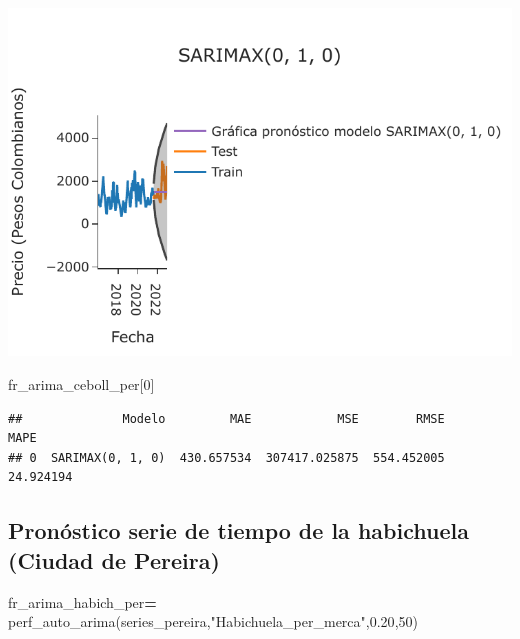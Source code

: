 \documentclass[
]{book}
\newenvironment{Shaded}{\begin{snugshade}}{\end{snugshade}}
\newcommand{\DecValTok}[1]{\textcolor[rgb]{0.00,0.00,0.81}{#1}}
\newcommand{\FloatTok}[1]{\textcolor[rgb]{0.00,0.00,0.81}{#1}}
\newcommand{\NormalTok}[1]{#1}
\newcommand{\OperatorTok}[1]{\textcolor[rgb]{0.81,0.36,0.00}{\textbf{#1}}}
\newcommand{\StringTok}[1]{\textcolor[rgb]{0.31,0.60,0.02}{#1}}
\begin{document}
\includegraphics{bookdown-demo_files/figure-latex/unnamed-chunk-164-159.pdf}

\begin{Shaded}
\begin{Highlighting}[]

\NormalTok{fr\_arima\_ceboll\_per[}\DecValTok{0}\NormalTok{]}
\end{Highlighting}
\end{Shaded}

\begin{verbatim}
##              Modelo         MAE            MSE        RMSE       MAPE
## 0  SARIMAX(0, 1, 0)  430.657534  307417.025875  554.452005  24.924194
\end{verbatim}

\hypertarget{pronuxf3stico-serie-de-tiempo-de-la-habichuela-ciudad-de-pereira-1}{%
\subsection{Pronóstico serie de tiempo de la habichuela (Ciudad de Pereira)}\label{pronuxf3stico-serie-de-tiempo-de-la-habichuela-ciudad-de-pereira-1}}

\begin{Shaded}
\begin{Highlighting}[]

\NormalTok{fr\_arima\_habich\_per}\OperatorTok{=}\NormalTok{ perf\_auto\_arima(series\_pereira,}\StringTok{"Habichuela\_per\_merca"}\NormalTok{,}\FloatTok{0.20}\NormalTok{,}\DecValTok{50}\NormalTok{)}
\end{Highlighting}
\end{Shaded}
\end{document}
